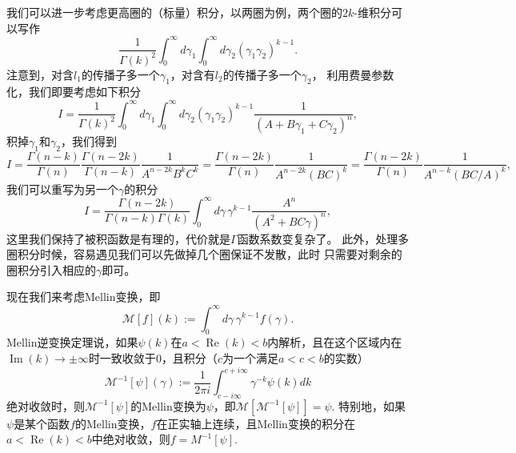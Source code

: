 \documentclass[11pt]{article}
\theoremstyle{definition}
\theoremstyle{plain}
\begin{document}
我们可以进一步考虑更高圈的（标量）积分，以两圈为例，两个圈的$2k$-维积分可以写作
\[
	\frac{1}{\Gamma(k)^2}\int_0^\infty d\gamma_1
	\int_0^\infty d\gamma_2 (\gamma_1\gamma_2)^{k-1}.
\]
注意到，对含$l_1$的传播子多一个$\gamma_1$，对含有$l_2$的传播子多一个$\gamma_2$，
利用费曼参数化，我们即要考虑如下积分
\[
	I=\frac{1}{\Gamma(k)^2}\int_0^\infty d\gamma_1
	\int_0^\infty d\gamma_2 (\gamma_1\gamma_2)^{k-1}
	\frac{1}{(A+B\gamma_1+C\gamma_2)^n},
\]
积掉$\gamma_1$和$\gamma_2$，我们得到
\[
	I=\frac{\Gamma(n-k)}{\Gamma(n)}\frac{\Gamma(n-2k)}{\Gamma(n-k)}
	\frac{1}{A^{n-2k}B^kC^k}=\frac{\Gamma(n-2k)}{\Gamma(n)}
	\frac{1}{A^{n-2k}(BC)^k}=\frac{\Gamma(n-2k)}{\Gamma(n)}
	\frac{1}{A^{n-k}(BC/A)^{k}},
\]
我们可以重写为另一个$\gamma$的积分
\[
	I=\frac{\Gamma(n-2k)}{\Gamma(n-k)\Gamma(k)}\int_0^\infty d\gamma\,\gamma^{k-1}
	\frac{A^n}{(A^2+BC\gamma)^n},
\]
这里我们保持了被积函数是有理的，代价就是$\Gamma$函数系数变复杂了。
此外，处理多圈积分时候，容易遇见我们可以先做掉几个圈保证不发散，此时
只需要对剩余的圈积分引入相应的$\gamma$即可。

现在我们来考虑Mellin变换，即
\[
	\mathcal M[f](k):=\int_0^\infty d\gamma\, \gamma^{k-1} f(\gamma).
\]
Mellin逆变换定理说，如果$\psi(k)$在$a<\operatorname{Re}(k)<b$内解析，且在这个区域内在$\operatorname{Im}(k)\to \pm \infty$时一致收敛于$0$，且积分（$c$为一个满足$a<c<b$的实数）
\[
	\mathcal M^{-1}[\psi](\gamma):=\frac{1}{2\pi i}\int_{c-i\infty}^{c+i\infty}\gamma^{-k}\psi(k)dk
\]
绝对收敛时，则$\mathcal M^{-1}[\psi]$的Mellin变换为$\psi$，即$\mathcal M[\mathcal M^{-1}[\psi]]=\psi$. 特别地，如果$\psi$是某个函数$f$的Mellin变换，$f$在正实轴上连续，且Mellin变换的积分在$a<\operatorname{Re}(k)<b$中绝对收敛，则$f=M^{-1}[\psi]$.
\end{document}
